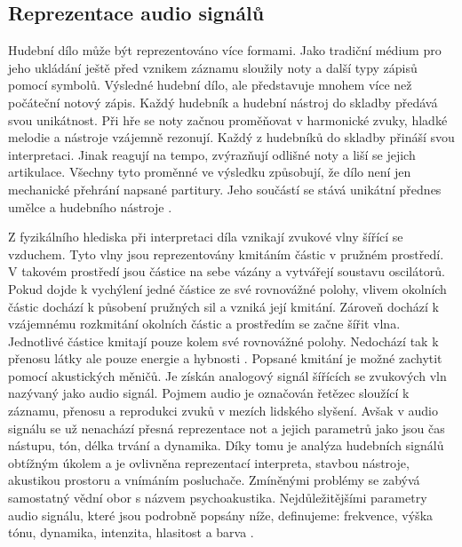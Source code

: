   \subsection{Reprezentace audio signálů} \label{sec:Audio}
  Hudební dílo může být reprezentováno více formami.
  Jako tradiční médium pro jeho ukládání ještě před vznikem záznamu sloužily noty a další typy zápisů pomocí symbolů.
  Výsledné hudební dílo, ale představuje mnohem více než počáteční notový zápis.
  Každý hudebník a hudební nástroj do skladby předává svou unikátnost.
  Při hře se noty začnou proměňovat v harmonické zvuky, hladké melodie a nástroje vzájemně rezonují. 
  Každý z hudebníků do skladby přináší svou interpretaci. Jinak reagují na tempo, zvýrazňují odlišné noty a liší se jejich artikulace.
  Všechny tyto proměnné ve výsledku způsobují, že dílo není jen mechanické přehrání napsané partitury.
  Jeho součástí se stává unikátní přednes umělce a hudebního nástroje \cite{fundamental_of_music_processing}.

  Z fyzikálního hlediska při interpretaci díla vznikají zvukové vlny šířící se vzduchem.
  Tyto vlny jsou reprezentovány kmitáním částic v pružném prostředí. V takovém prostředí jsou částice na sebe vázány a vytvářejí soustavu oscilátorů. Pokud dojde k vychýlení jedné částice ze své rovnovážné polohy,
  vlivem okolních částic dochází k působení pružných sil a vzniká její kmitání. 
  Zároveň dochází k vzájemnému rozkmitání okolních částic a prostředím se začne šířit vlna. Jednotlivé částice kmitají pouze kolem své rovnovážné polohy. Nedochází tak k přenosu látky ale pouze energie a hybnosti \cite{crocker1998handbook}.
  Popsané kmitání je možné zachytit pomocí akustických měničů.
  Je získán analogový signál šířících se zvukových vln nazývaný jako audio signál.
  Pojmem audio je označován řetězec sloužící k záznamu, přenosu a reprodukci zvuků v mezích lidského slyšení.
  Avšak v audio signálu se už nenachází přesná reprezentace not a jejich parametrů jako jsou čas nástupu, tón, délka trvání a dynamika.
  Díky tomu je analýza hudebních signálů obtížným úkolem a je ovlivněna reprezentací interpreta, stavbou nástroje, akustikou prostoru a vnímáním posluchače.
  Zmíněnými problémy se zabývá samostatný vědní obor s názvem psychoakustika.
  Nejdůležitějšími parametry audio signálu, které jsou podrobně popsány níže, definujeme: frekvence, výška tónu, dynamika, intenzita, hlasitost a barva \cite{fundamental_of_music_processing}.

